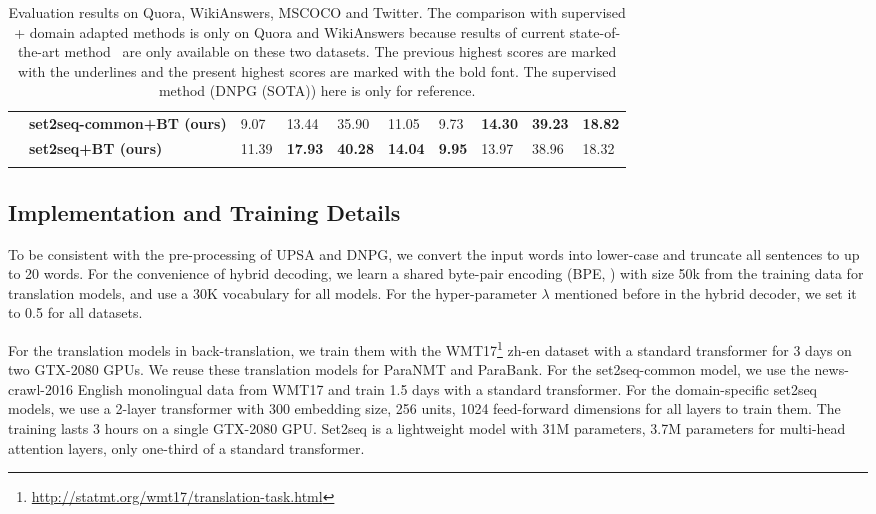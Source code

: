\begin{table*}[ht]
\begin{tabular}{p{2cm}p{3.6cm}p{0.8cm}<{\centering}p{0.8cm}<{\centering}p{0.8cm}<{\centering}p{0.8cm}<{\centering}p{0.8cm}<{\centering}p{0.8cm}<{\centering}p{0.8cm}<{\centering}p{0.8cm}<{\centering}}
& \textbf{set2seq-common+BT \scriptsize{(ours)}} & 
 9.07 & 13.44 & 35.90 & 11.05 &  9.73 & \textbf{14.30} & \textbf{39.23} & \textbf{18.82} \\
& \textbf{set2seq+BT \scriptsize{(ours)}} & 
11.39 & \textbf{17.93} & \textbf{40.28} & \textbf{14.04} & \textbf{9.95} & 13.97 & 38.96 & 18.32 \\
\\ [-1.8ex]
\hline
\end{tabular}
\caption{\label{tab:result}
Evaluation results on Quora, WikiAnswers, MSCOCO and Twitter. The comparison 
with supervised + domain adapted methods is only on Quora and WikiAnswers 
because results of current state-of-the-art 
method~\citep{li2019decomposable} are only available on these two datasets.
The previous highest scores are marked with the underlines and the present highest scores are marked with the bold font.
The supervised method (DNPG (SOTA)) here is only for reference.
}
\end{table*}

\subsection{Implementation and Training Details} \label{sec:exset}
To be consistent with the pre-processing of UPSA and DNPG, we convert the input words into lower-case and truncate all sentences to up to 20 words. 
For the convenience of hybrid decoding, 
we learn a shared byte-pair encoding (BPE, \citet{sennrich2016edinburgh}) 
with size 50k from the training data for translation models, 
and use a 30K vocabulary for all models. 
For the hyper-parameter $\lambda$ mentioned before in the hybrid decoder,
we set it to 0.5 for all datasets.

For the translation models in back-translation, we train them with the WMT17\footnote{\url{http://statmt.org/wmt17/translation-task.html}} zh-en dataset \citep{ziemski2016united} with a standard transformer for 3 days on two GTX-2080 GPUs. We reuse these translation models for ParaNMT and ParaBank. For the set2seq-common model, we use the news-crawl-2016 English monolingual data from WMT17 and train 1.5 days with a standard transformer. For the domain-specific set2seq models, we use a 2-layer transformer with 300 embedding size, 256 units, 1024 feed-forward dimensions for all layers to train them. The training lasts 3 hours on a single GTX-2080 GPU. Set2seq is a lightweight model with 31M parameters, 3.7M parameters for multi-head attention layers, only one-third of a standard transformer.

